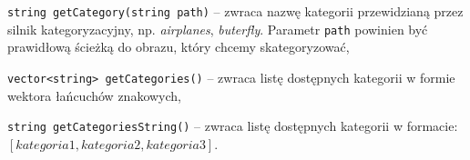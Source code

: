 \begin{compactitem}
	\item \texttt{string getCategory(string path)} -- zwraca nazwę kategorii przewidzianą przez silnik kategoryzacyjny, np. \emph{airplanes}, \emph{buterfly}. Parametr \texttt{path} powinien być prawidłową ścieżką do obrazu, który chcemy skategoryzować,
	\item \texttt{vector<string> getCategories()} -- zwraca listę dostępnych kategorii w formie wektora łańcuchów znakowych,
	\item \texttt{string getCategoriesString()} -- zwraca listę dostępnych kategorii w formacie: $\allowbreak[kategoria1, kategoria2, kategoria3]$.
\end{compactitem}
	